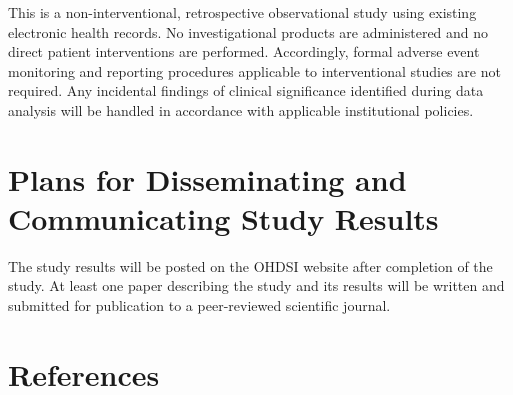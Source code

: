 \documentclass[
  12pt,
]{article}
\begin{document}
This is a non-interventional, retrospective observational study using existing electronic health records. No investigational products are administered and no direct patient interventions are performed. Accordingly, formal adverse event monitoring and reporting procedures applicable to interventional studies are not required. Any incidental findings of clinical significance identified during data analysis will be handled in accordance with applicable institutional policies.

\section{Plans for Disseminating and Communicating Study Results}\label{plans-for-disseminating-and-communicating-study-results}

The study results will be posted on the OHDSI website after completion of the study. At least one paper describing the study and its results will be written and submitted for publication to a peer-reviewed scientific journal.

\clearpage

\section*{References}\label{references}
\end{document}
